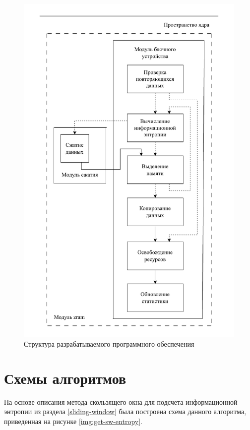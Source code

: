 \begin{figure}[H]
	\begin{center}
		\includegraphics[scale=0.6]{inc/img/structure.pdf}
	\end{center}
	\captionsetup{justification=centering}
	\caption{Структура разрабатываемого программного обеспечения}
	\label{img:structure}
\end{figure}

\section{Схемы алгоритмов}

На основе описания метода скользящего окна для подсчета информационной энтропии из раздела \ref{sliding-window} была построена схема данного алгоритма, приведенная на рисунке \ref{img:get-sw-entropy}.

